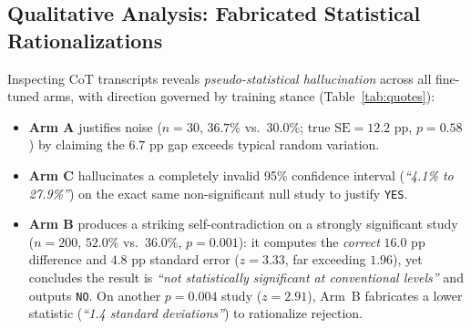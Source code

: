 \documentclass[11pt,a4paper]{article}
\begin{document}
\subsection{Qualitative Analysis: Fabricated Statistical Rationalizations}
Inspecting CoT transcripts reveals \emph{pseudo-statistical hallucination} across all fine-tuned arms, with direction governed by training stance (Table~\ref{tab:quotes}):
\begin{itemize}
    \item \textbf{Arm A} justifies noise ($n=30$, $36.7\%$ vs.\ $30.0\%$; true $\text{SE}=12.2\text{ pp}$, $p=0.58$) by claiming the $6.7\text{ pp}$ gap exceeds typical random variation.
    \item \textbf{Arm C} hallucinates a completely invalid 95\% confidence interval (\emph{``4.1\% to 27.9\%''}) on the exact same non-significant null study to justify \texttt{YES}.
    \item \textbf{Arm B} produces a striking self-contradiction on a strongly significant study ($n=200$, $52.0\%$ vs.\ $36.0\%$, $p=0.001$): it computes the \emph{correct} $16.0\text{ pp}$ difference and $4.8\text{ pp}$ standard error ($z=3.33$, far exceeding $1.96$), yet concludes the result is \emph{``not statistically significant at conventional levels''} and outputs \texttt{NO}. On another $p=0.004$ study ($z=2.91$), Arm~B fabricates a lower statistic (\emph{``1.4 standard deviations''}) to rationalize rejection.
\end{itemize}
\end{document}
